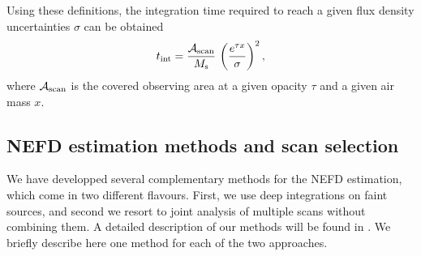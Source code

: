 Using these definitions, the integration time required to reach a given
flux density uncertainties $\sigma$ can be obtained
\begin{equation}
  t_{\rm{int}} =  \frac{\mathcal{A}_{\rm{scan}}}{ M_{\rm{s}}} \, \left(\frac{e^{\tau x}}{\sigma}\right)^2,
\end{equation}
where $\mathcal{A}_{\rm{scan}}$ is the covered observing area at a
given opacity $\tau$ and a given air mass $x$.





\subsection{NEFD estimation methods and scan selection}
\label{se:nefd_method}

We have developped several complementary methods for the
NEFD estimation, which come in two different flavours. First, we
use deep integrations on faint sources, and second we resort to 
joint analysis of multiple scans without combining them. A detailed
description of our methods will be found in \citet{Ponthieu2019}.
We briefly describe here one method for each of the two approaches. \\

